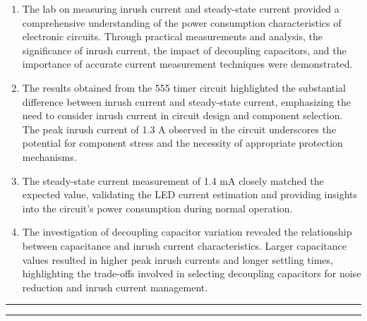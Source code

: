 \documentclass[a4paper,11pt]{article}%
\begin{document}
\begin{enumerate}
	\item The lab on measuring inrush current and steady-state current provided a comprehensive understanding of the power consumption characteristics of electronic circuits. Through practical measurements and analysis, the significance of inrush current, the impact of decoupling capacitors, and the importance of accurate current measurement techniques were demonstrated.

	\item The results obtained from the 555 timer circuit highlighted the substantial difference between inrush current and steady-state current, emphasizing the need to consider inrush current in circuit design and component selection. The peak inrush current of 1.3 A observed in the circuit underscores the potential for component stress and the necessity of appropriate protection mechanisms.

	\item The steady-state current measurement of 1.4 mA closely matched the expected value, validating the LED current estimation and providing insights into the circuit's power consumption during normal operation.

	\item The investigation of decoupling capacitor variation revealed the relationship between capacitance and inrush current characteristics. Larger capacitance values resulted in higher peak inrush currents and longer settling times, highlighting the trade-offs involved in selecting decoupling capacitors for noise reduction and inrush current management.
\end{enumerate}

\vspace{50px}
\hrule
\hrule

\pagebreak





\end{document}
